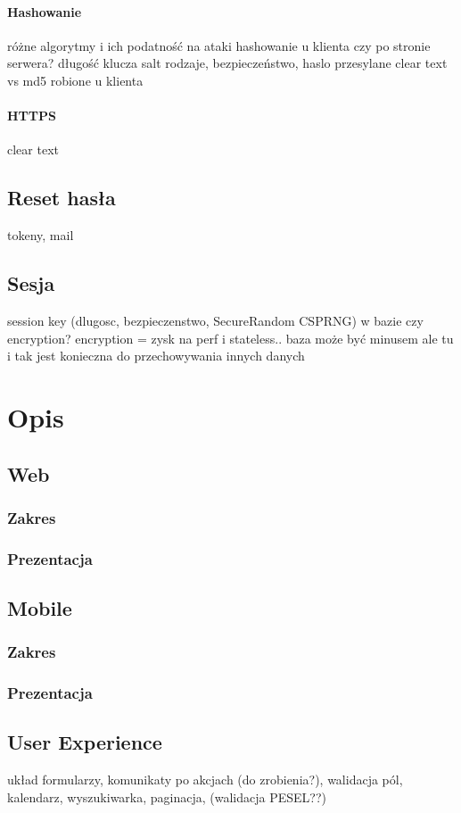 \documentclass[11pt]{aghdpl}
\begin{document}
\subsubsection{Hashowanie}
różne algorytmy i ich podatność na ataki
hashowanie u klienta czy po stronie serwera?
długość klucza
salt
rodzaje, bezpieczeństwo, haslo przesylane clear text vs md5 robione u klienta
\subsubsection{HTTPS}
clear text
\section{Reset hasła}
tokeny, mail
\section{Sesja}
session key (dlugosc, bezpieczenstwo, SecureRandom CSPRNG) w bazie czy encryption? encryption = zysk na perf i stateless.. baza może być minusem ale tu i tak jest konieczna do przechowywania innych danych


\chapter{Opis}

\section{Web}
\subsection{Zakres}
\subsection{Prezentacja}
\section{Mobile}
\subsection{Zakres}
\subsection{Prezentacja}
\section{User Experience}
układ formularzy, komunikaty po akcjach (do zrobienia?), walidacja pól, kalendarz, wyszukiwarka, paginacja, (walidacja PESEL??)
\end{document}
